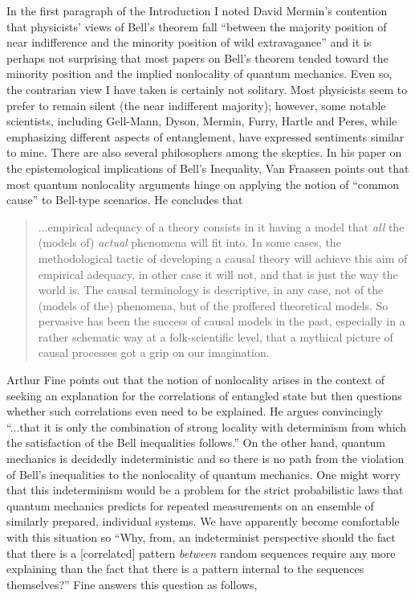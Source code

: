 \documentclass[12pt]{article}
\begin{document}
In the first paragraph of the Introduction I noted David Mermin's contention that physicists' views of Bell's theorem fall ``between the majority position of near indifference and the minority position of wild extravagance''\cite{Mer85} and it is perhaps not surprising that most papers on Bell's theorem tended toward the minority position and the implied nonlocality of quantum mechanics.  Even so, the contrarian view I have taken is certainly not solitary.  Most physicists seem to prefer to remain silent (the near indifferent majority); however,  some notable scientists, including Gell-Mann, Dyson, Mermin, Furry, Hartle and Peres, while emphasizing different aspects of entanglement, have expressed sentiments similar to mine.  There are also several philosophers among the skeptics.  In his paper on the epistemological implications of Bell's Inequality\cite{Van82}, Van Fraassen points out that most quantum nonlocality arguments hinge on applying the notion of ``common cause'' to Bell-type scenarios.  He concludes that
\begin{quote}
...empirical adequacy of a theory consists in it having a model that {\it all} the (models of) {\it actual} phenomena will fit into.  In some cases, the methodological tactic of developing a causal theory will achieve this aim of empirical adequacy, in other case it will not, and that is just the way the world is.  The causal terminology is descriptive, in any case, not of the (models of the) phenomena, but of the proffered theoretical models.  So pervasive has been the success of causal models in the past, especially in a rather schematic way at a folk-scientific level, that a mythical picture of causal processes got a grip on our imagination.
\end{quote}
Arthur Fine\cite{Fin89} points out that the notion of nonlocality arises in the context of seeking an explanation for the correlations of entangled state but then questions whether such correlations even need to be explained.  He argues convincingly ``...that it is only the combination of strong locality with determinism from which the satisfaction of the Bell inequalities follows.''  On the other hand, quantum mechanics is decidedly indeterministic and so there is no path from the violation of Bell's inequalities to the nonlocality of quantum mechanics.  One might worry that this indeterminism would be a problem for the strict probabilistic laws that quantum mechanics predicts for repeated measurements on an ensemble of similarly prepared, individual systems.  We have apparently become comfortable with this situation so ``Why, from, an indeterminist perspective should the fact that there is a [correlated] pattern {\it between} random sequences require any more explaining than the fact that there is a pattern internal to the sequences themselves?''  Fine answers this question as follows,
\end{document}
